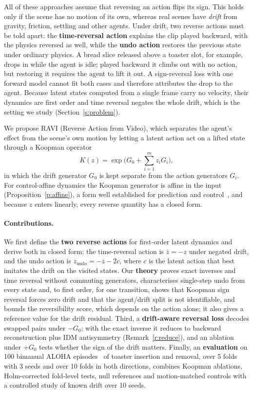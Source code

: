 \documentclass{jcse}
\newcommand{\method}{RAVI}
\newcommand{\zb}{\bar{z}}
\newcommand{\zundo}{z_{\mathrm{undo}}}
\begin{document}
All of these approaches assume that reversing an action flips its sign.
This holds only if the scene has no motion of its own, whereas real scenes have \emph{drift} from gravity, friction, settling and other agents.
Under drift, two reverse actions must be told apart: the \textbf{time-reversal action} explains the clip played backward, with the physics reversed as well, while the \textbf{undo action} restores the previous state under ordinary physics.
A bread slice released above a toaster slot, for example, drops in while the agent is idle; played backward it climbs out with no action, but restoring it requires the agent to lift it out.
A sign-reversal loss with one forward model cannot fit both cases and therefore attributes the drop to the agent.
Because latent states computed from a single frame carry no velocity, their dynamics are first order and time reversal negates the whole drift, which is the setting we study (Section~\ref{s:problem}).

We propose {\method} (Reverse Action from Video), which separates the agent's effect from the scene's own motion by letting a latent action act on a lifted state through a Koopman operator~\cite{koopman1931,mezic2005spectral,brunton2022modern}
\begin{equation}
K(z)=\exp\Big(G_0+\sum_{i=1}^m z_iG_i\Big),
\label{e:koopman}
\end{equation}
in which the drift generator $G_0$ is kept separate from the action generators $G_i$.
For control-affine dynamics the Koopman generator is affine in the input~\cite{goswami2017global,bruder2021bilinear} (Proposition~\ref{p:affine}), a form well established for prediction and control~\cite{korda2018koopman}, and because $z$ enters linearly, every reverse quantity has a closed form.

\paragraph{Contributions.}
We first define the \textbf{two reverse actions} for first-order latent dynamics and derive both in closed form: the time-reversal action is $\zb=-z$ under negated drift, and the undo action is $\zundo=-z-2c$, where $c$ is the latent action that best imitates the drift on the visited states.
Our \textbf{theory} proves exact inverses and time reversal without commuting generators, characterises single-step undo from every state and, to first order, for one transition, shows that Koopman sign reversal forces zero drift and that the agent/drift split is not identifiable, and bounds the reversibility score, which depends on the action alone; it also gives a reference value for the drift residual.
Third, a \textbf{drift-aware reversal loss} decodes swapped pairs under $-G_0$; with the exact inverse it reduces to backward reconstruction plus IDM antisymmetry (Remark~\ref{r:reduce}), and an ablation under $+G_0$ tests whether the sign of the drift matters.
Finally, an \textbf{evaluation} on 100 bimanual ALOHA episodes~\cite{zhao2023aloha} of toaster insertion and removal, over 5 folds with 3 seeds and over 10 folds in both directions, combines Koopman ablations, Holm-corrected fold-level tests, null references and motion-matched controls with a controlled study of known drift over 10 seeds.
\end{document}
